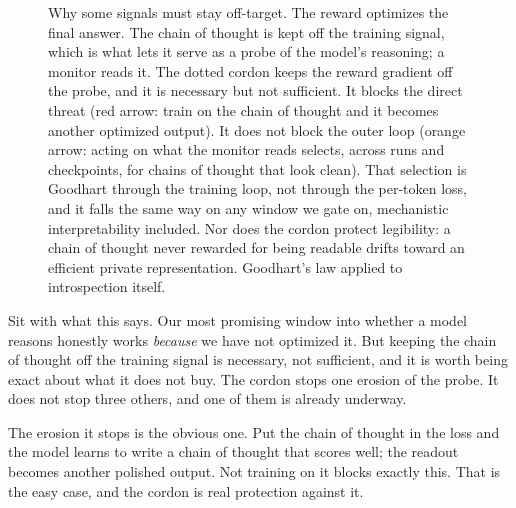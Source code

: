 \begin{figure}[h]
\caption{Why some signals must stay off-target. The reward optimizes the final answer. The chain of thought is kept off the training signal, which is what lets it serve as a probe of the model's reasoning; a monitor reads it. The dotted cordon keeps the reward gradient off the probe, and it is necessary but not sufficient. It blocks the direct threat (red arrow: train on the chain of thought and it becomes another optimized output). It does not block the outer loop (orange arrow: acting on what the monitor reads selects, across runs and checkpoints, for chains of thought that look clean). That selection is Goodhart through the training loop, not through the per-token loss, and it falls the same way on any window we gate on, mechanistic interpretability included. Nor does the cordon protect legibility: a chain of thought never rewarded for being readable drifts toward an efficient private representation. Goodhart's law applied to introspection itself.}
\label{fig:cot-cordon}
\end{figure}

Sit with what this says. Our most promising window into whether a model reasons honestly works \emph{because} we have not optimized it. But keeping the chain of thought off the training signal is necessary, not sufficient, and it is worth being exact about what it does not buy. The cordon stops one erosion of the probe. It does not stop three others, and one of them is already underway.

The erosion it stops is the obvious one. Put the chain of thought in the loss and the model learns to write a chain of thought that scores well; the readout becomes another polished output. Not training on it blocks exactly this. That is the easy case, and the cordon is real protection against it.


